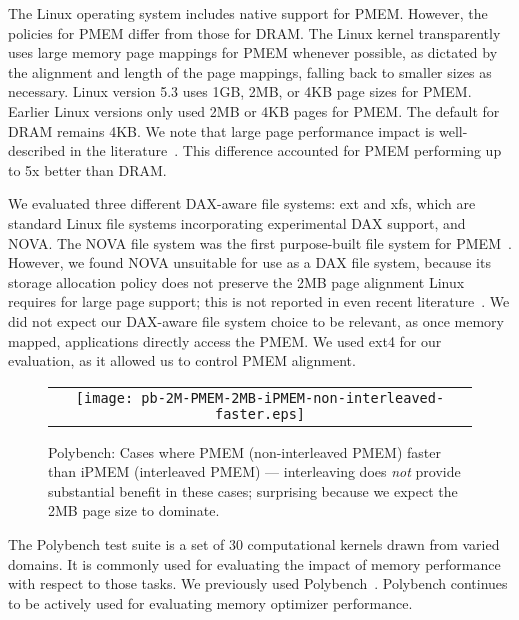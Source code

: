 The Linux operating system includes native support for PMEM.  However, the policies for PMEM differ from those for DRAM. The Linux kernel transparently uses large memory page mappings for PMEM whenever possible, as dictated by the alignment and length of the page mappings, falling back to smaller sizes as necessary.  Linux version 5.3 uses 1GB, 2MB, or 4KB page sizes for PMEM.  Earlier Linux versions only used 2MB or 4KB pages for PMEM. The default for DRAM remains 4KB.  We note that large page performance impact is well-described in the literature~\cite{agarwal2017thermostat,panwar2018making}. This difference accounted for PMEM performing up to 5x better than DRAM.


We evaluated three different DAX-aware file systems: ext and xfs, which are standard Linux file systems incorporating experimental DAX support, and NOVA. The NOVA file system was the first purpose-built file system for PMEM~\cite{xu2016nova}.  However, we found NOVA unsuitable for use as a DAX file system, because its storage allocation policy does not preserve the 2MB page alignment Linux requires for large page support; this is not reported in even recent literature~\cite{izraelevitz2019basic,yang2019empirical}. We did not expect our DAX-aware file system choice to be relevant, as once memory mapped, applications directly access the PMEM.  We used ext4 for our evaluation, as it allowed us to control PMEM alignment.

\begin{figure}[!b]
  \captionsetup{justification=centering}
  \centering
  \caption{Polybench: Cases where PMEM (non-interleaved PMEM) faster than iPMEM (interleaved PMEM) --- interleaving does \textit{not} provide substantial benefit in these cases; surprising because we expect the 2MB page size to dominate.}
  \vspace{2mm}
  \label{fig:polybench:PMEM-vs-ipmem}
  \begin{tabular}{c}
    \texttt{[image: pb-2M-PMEM-2MB-iPMEM-non-interleaved-faster.eps]}
  \end{tabular}
\end{figure}



The Polybench test suite is a set of 30 computational kernels drawn from varied domains. It is commonly used for evaluating the impact of memory performance with respect to those tasks. We previously used Polybench~\cite{doudali2017comerge}. Polybench continues to be actively used for evaluating memory optimizer performance.



